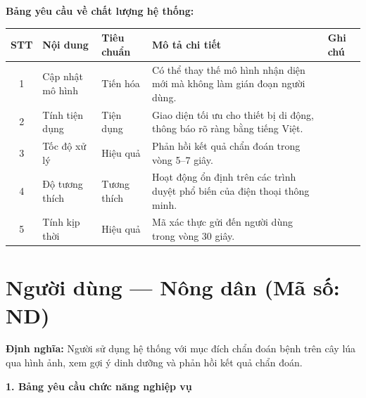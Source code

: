 \documentclass[12pt,a4paper]{article}
\begin{document}
\textbf{Bảng yêu cầu về chất lượng hệ thống:}
\begin{longtable}{|c|l|l|p{6.5cm}|l|}
    \hline
    \rowcolor{headerblue}
    \textbf{STT} & \textbf{Nội dung} & \textbf{Tiêu chuẩn} & \textbf{Mô tả chi tiết}                                                    & \textbf{Ghi chú} \\
    \hline
    \endhead
    1            & Cập nhật mô hình  & Tiến hóa            & Có thể thay thế mô hình nhận diện mới mà không làm gián đoạn người dùng.   &                  \\
    \hline
    2            & Tính tiện dụng    & Tiện dụng           & Giao diện tối ưu cho thiết bị di động, thông báo rõ ràng bằng tiếng Việt.  &                  \\
    \hline
    3            & Tốc độ xử lý      & Hiệu quả            & Phản hồi kết quả chẩn đoán trong vòng 5--7 giây.                           &                  \\
    \hline
    4            & Độ tương thích    & Tương thích         & Hoạt động ổn định trên các trình duyệt phổ biến của điện thoại thông minh. &                  \\
    \hline
    5            & Tính kịp thời     & Hiệu quả            & Mã xác thực gửi đến người dùng trong vòng 30 giây.                         &                  \\
    \hline
\end{longtable}

\hrulefill

\section{Người dùng --- Nông dân (Mã số: ND)}

\textbf{Định nghĩa:} Người sử dụng hệ thống với mục đích chẩn đoán bệnh trên cây lúa qua hình ảnh, xem gợi ý dinh dưỡng và phản hồi kết quả chẩn đoán.

\vspace{0.3cm}
\textbf{1. Bảng yêu cầu chức năng nghiệp vụ}
\end{document}
